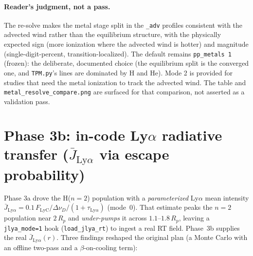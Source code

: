 \documentclass[english,a4paper]{kiseon_memo}
\begin{document}
\paragraph{Reader's judgment, not a pass.} The re-solve makes the metal stage
split in the \texttt{\_adv} profiles consistent with the advected wind rather than
the equilibrium structure, with the physically expected sign (more ionization
where the advected wind is hotter) and magnitude (single-digit-percent,
transition-localized). The default remains \texttt{pp\_metals 1} (frozen): the
deliberate, documented choice (the equilibrium split is the converged one, and
\texttt{TPM.py}'s lines are dominated by H and He). Mode 2 is provided for studies
that need the metal ionization to track the advected wind. The table and
\texttt{metal\_resolve\_compare.png} are surfaced for that comparison, not
asserted as a validation pass.

\section{Phase 3b: in-code Ly\(\alpha\) radiative transfer (\(\bar J_{\mathrm{Ly}\alpha}\) via escape probability)}

Phase 3a drove the H(\(n{=}2\)) population with a \emph{parameterized} Ly\(\alpha\)
mean intensity \(\bar J_{\mathrm{Ly}\alpha}=0.1\,F_{\mathrm{LyC}}/\Delta\nu_D/(1+\tau_{\mathrm{Ly}\alpha})\)
(mode~0). That estimate peaks the \(n{=}2\) population near \(2\,R_p\) and
\emph{under-pumps} it across \(1.1\)--\(1.8\,R_p\), leaving a \texttt{jlya\_mode=1}
hook (\texttt{load\_jlya\_rt}) to ingest a real RT field. Phase~3b supplies the real
\(\bar J_{\mathrm{Ly}\alpha}(r)\). Three findings reshaped the original plan
(a Monte Carlo with an offline two-pass and a \(\beta\)-on-cooling term):
\end{document}
